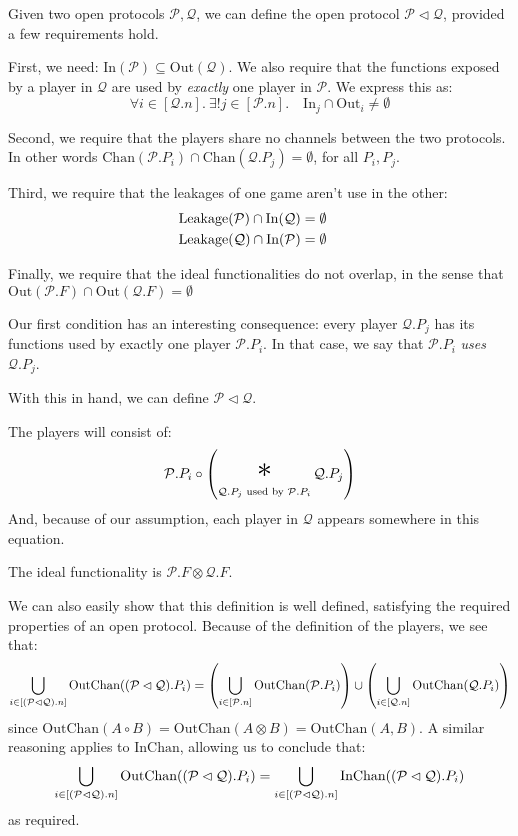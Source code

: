 \begin{definition}
Given two open protocols $\mathcal{P}, \mathcal{Q}$,
we can define the open protocol $\mathcal{P} \lhd \mathcal{Q}$,
provided a few requirements hold.

First, we need: $\text{In}(\mathcal{P}) \subseteq \text{Out}(\mathcal{Q})$.
We also require that the functions exposed by a player in $\mathcal{Q}$
are used by \emph{exactly} one player in $\mathcal{P}$.
We express this as:
\[
  \forall i \in [\mathcal{Q}.n].\ \exists! j \in [\mathcal{P}.n].\quad \text{In}_j \cap \text{Out}_i \neq \emptyset
\]

Second, we require that the players share no channels between the two
protocols.
In other words $\text{Chan}(\mathcal{P}.P_i) \cap \text{Chan}(\mathcal{Q}.P_j) = \emptyset$, for all $P_i, P_j$.

Third, we require that the leakages of one game aren't use in the other:
$$
\begin{aligned}
&\text{Leakage}(\mathcal{P}) \cap \text{In}(\mathcal{Q}) = \emptyset\cr
&\text{Leakage}(\mathcal{Q}) \cap \text{In}(\mathcal{P}) = \emptyset
\end{aligned}
$$

Finally, we require that the ideal functionalities do not overlap, 
  in the sense that $\text{Out}(\mathcal{P}.F) \cap \text{Out}(\mathcal{Q}.F) = \emptyset$

Our first condition has an interesting consequence: every player $\mathcal{Q}.P_j$
has its functions used by exactly one player $\mathcal{P}.P_i$.
In that case, we say that $\mathcal{P}.P_i$ \emph{uses} $\mathcal{Q}.P_j$.

With this in hand, we can define $\mathcal{P} \lhd \mathcal{Q}$.

The players will consist of:
$$
  \mathcal{P}.P_i \circ \left( \bigast_{\mathcal{Q}.P_j \text{ used by } \mathcal{P}.P_i } \mathcal{Q}.P_j \right)
$$
And, because of our assumption, each player in $\mathcal{Q}$ appears
somewhere in this equation.

The ideal functionality is $\mathcal{P}.F \otimes \mathcal{Q}.F$.

We can also easily show that this definition is well defined, satisfying
the required properties of an open protocol.
Because of the definition of the players, we see that:
$$
  \bigcup_{i \in [(\mathcal{P} \lhd \mathcal{Q}).n]} \text{OutChan}((\mathcal{P} \lhd \mathcal{Q}).{P_i})
  = \left(\bigcup_{i \in [\mathcal{P}.n]} \text{OutChan}(\mathcal{P}.P_i)\right) \cup
  \left(\bigcup_{i \in [\mathcal{Q}.n]} \text{OutChan}(\mathcal{Q}.P_i)\right)
$$
  since $\text{OutChan}(A \circ B) = \text{OutChan}(A \otimes B) = \text{OutChan}(A, B)$.
A similar reasoning applies to $\text{InChan}$, allowing us to conclude that:
$$
  \bigcup_{i \in [(\mathcal{P} \lhd \mathcal{Q}).n]} \text{OutChan}((\mathcal{P} \lhd \mathcal{Q}).{P_i}) =
  \bigcup_{i \in [(\mathcal{P} \lhd \mathcal{Q}).n]} \text{InChan}((\mathcal{P} \lhd \mathcal{Q}).{P_i})
$$
as required.


\end{definition}
